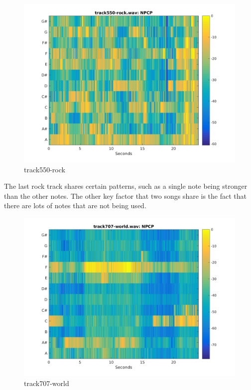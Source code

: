 \documentclass[11pt, a4paper]{article}
\begin{document}
\begin{figure}[H]
    \centering
    \includegraphics[width=.8\textwidth]{track550-rock-NPCP.png}
    \caption{track550-rock}
\end{figure}


The last rock track shares certain patterns, such as a single note being stronger than the other notes. The other key factor that two songs share is the fact that there are lots of notes that are not being used. 

\begin{figure}[H]
    \centering
    \includegraphics[width=.8\textwidth]{track707-world-NPCP.png}
    \caption{track707-world}
\end{figure}
\end{document}

